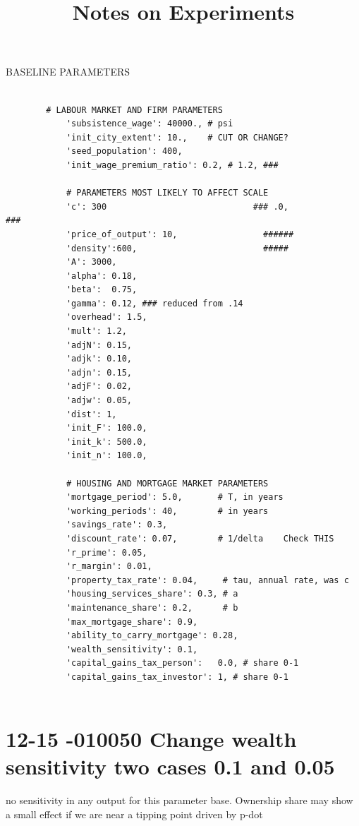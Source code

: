 \documentclass{article}
\title{Notes on Experiments}
\begin{document}
\maketitle
\tableofcontents \newpage
BASELINE PARAMETERS
\begin{verbatim}

        # LABOUR MARKET AND FIRM PARAMETERS
            'subsistence_wage': 40000., # psi
            'init_city_extent': 10.,    # CUT OR CHANGE?
            'seed_population': 400,
            'init_wage_premium_ratio': 0.2, # 1.2, ###

            # PARAMETERS MOST LIKELY TO AFFECT SCALE
            'c': 300                             ### .0,                            ###
            'price_of_output': 10,                 ######
            'density':600,                         #####
            'A': 3000,
            'alpha': 0.18,
            'beta':  0.75,
            'gamma': 0.12, ### reduced from .14
            'overhead': 1.5,
            'mult': 1.2,
            'adjN': 0.15,
            'adjk': 0.10,
            'adjn': 0.15,
            'adjF': 0.02,
            'adjw': 0.05, 
            'dist': 1, 
            'init_F': 100.0,
            'init_k': 500.0,
            'init_n': 100.0,

            # HOUSING AND MORTGAGE MARKET PARAMETERS
            'mortgage_period': 5.0,       # T, in years
            'working_periods': 40,        # in years
            'savings_rate': 0.3,
            'discount_rate': 0.07,        # 1/delta    Check THIS
            'r_prime': 0.05,
            'r_margin': 0.01,
            'property_tax_rate': 0.04,     # tau, annual rate, was c
            'housing_services_share': 0.3, # a
            'maintenance_share': 0.2,      # b
            'max_mortgage_share': 0.9,
            'ability_to_carry_mortgage': 0.28,
            'wealth_sensitivity': 0.1,
            'capital_gains_tax_person':   0.0, # share 0-1
            'capital_gains_tax_investor': 1, # share 0-1
    
\end{verbatim}
\newpage


\section{12-15 -010050 Change wealth sensitivity two cases 0.1 and 0.05 }
no sensitivity in any output for this parameter base. Ownership share may show  a small effect if we are near a tipping point driven by p-dot
\end{document}
